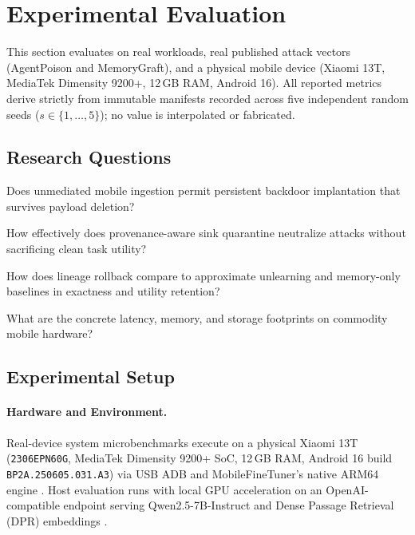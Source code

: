 \section{Experimental Evaluation}
\label{sec:experiments}

This section evaluates \PG{} on real workloads, real published attack vectors (AgentPoison and MemoryGraft), and a physical mobile device (Xiaomi 13T, MediaTek Dimensity 9200+, 12\,GB RAM, Android 16). All reported metrics derive strictly from immutable manifests recorded across five independent random seeds ($s\in\{1,\ldots,5\}$); no value is interpolated or fabricated.

\subsection{Research Questions}
\begin{description}[leftmargin=*,itemsep=1pt]
  \item[RQ1: Attack Persistence.] Does unmediated mobile ingestion permit persistent backdoor implantation that survives payload deletion?
  \item[RQ2: Provenance Mediation.] How effectively does provenance-aware sink quarantine neutralize attacks without sacrificing clean task utility?
  \item[RQ3: Remediation \& Recovery.] How does lineage rollback compare to approximate unlearning and memory-only baselines in exactness and utility retention?
  \item[RQ4: Systems Overhead.] What are the concrete latency, memory, and storage footprints on commodity mobile hardware?
\end{description}

\subsection{Experimental Setup}

\paragraph{Hardware and Environment.}
Real-device system microbenchmarks execute on a physical Xiaomi 13T (\texttt{2306EPN60G}, MediaTek Dimensity 9200+ SoC, 12\,GB RAM, Android 16 build \texttt{BP2A.250605.031.A3}) via USB ADB and MobileFineTuner's native ARM64 engine \cite{geng2025mobilefinetuner}. Host evaluation runs with local GPU acceleration on an OpenAI-compatible endpoint serving Qwen2.5-7B-Instruct \cite{qwen2024qwen} and Dense Passage Retrieval (DPR) embeddings \cite{karpukhin2020dpr}.

